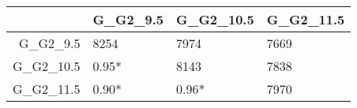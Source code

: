 \begin{table}[ht]
\centering
\begin{tabular}{rlll}
  \hline
 & G\_G2\_9.5 & G\_G2\_10.5 & G\_G2\_11.5 \\ 
  \hline
G\_G2\_9.5 & 8254 & 7974 & 7669 \\ 
  G\_G2\_10.5 &  0.95*  & 8143 & 7838 \\ 
  G\_G2\_11.5 &  0.90*  &  0.96*  & 7970 \\ 
   \hline
\end{tabular}
\end{table}
